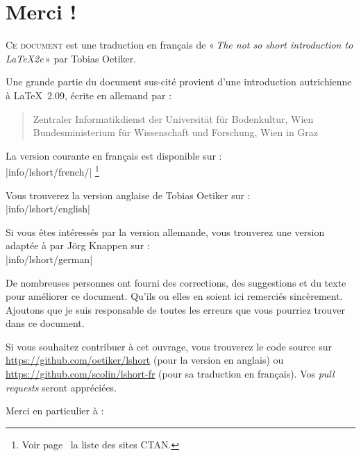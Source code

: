 \chapter{Merci !}
\thispagestyle{plain}

\label{lettrine}
\lettrine{C}{e document}
est une traduction en français de «\,\emph{The
not so short introduction to LaTeX2e}\,» par Tobias Oetiker.

\noindent
Une grande partie du document sus-cité provient d'une introduction
autrichienne à \LaTeX\ 2.09, écrite en allemand par :
\begin{verse}
%
{Zentraler Informatikdienst der Universit\"at f\"ur Bodenkultur, Wien}
%
   {Bundesministerium f\"ur Wissenschaft und Forschung, Wien}
%
   {in Graz}
\end{verse}

La version courante en français est disponible sur :\\
\CTAN|info/lshort/french/|
\footnote{Voir page~\pageref{CTAN} la liste des sites CTAN.}

Vous trouverez la version anglaise de Tobias Oetiker sur :\\
\CTAN|info/lshort/english|

Si vous êtes intéressés par la version allemande, vous trouverez une
version adaptée à \LaTeXe{} par J\"org Knappen sur :\\
\CTAN|info/lshort/german|

\newpage \noindent De nombreuses personnes ont fourni des corrections, des
suggestions et du texte pour améliorer ce document. Qu'ils ou elles en soient
ici remerciés sincèrement. Ajoutons que je suis responsable de toutes
les erreurs que vous pourriez trouver dans ce document.

Si vous souhaitez contribuer à cet ouvrage, vous trouverez le code
source sur \url{https://github.com/oetiker/lshort} (pour la version en
anglais) ou \url{https://github.com/scolin/lshort-fr} (pour sa
traduction en français). Vos \emph{pull requests} seront appréciées.

Merci en particulier à :


